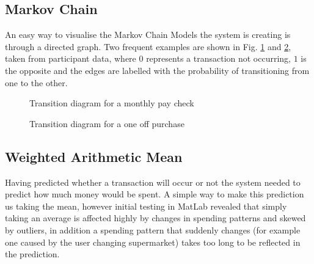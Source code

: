 \subsection{Markov Chain}

An easy way to visualise the Markov Chain Models the system is creating is through a directed graph. Two frequent examples are shown in Fig. \ref{fig:transition-monthly} and \ref{fig:transition-one}, taken from participant data, where $0$ represents a transaction not occurring, $1$ is the opposite and the edges are labelled with the probability of transitioning from one to the other. 

\begin{figure}[h]
\centering
{}
\caption{Transition diagram for a monthly pay check}
\label{fig:transition-monthly}
\end{figure}

\begin{figure}[h]
\centering
{}
\caption{Transition diagram for a one off purchase}
\label{fig:transition-one}
\end{figure}

\subsection{Weighted Arithmetic Mean}
Having predicted whether a transaction will occur or not the system needed to predict how much money would be spent. A simple way to make this prediction us taking the mean, however initial testing in MatLab revealed that simply taking an average is affected highly by changes in spending patterns and skewed by outliers, in addition a spending pattern that suddenly changes (for example one caused by the user changing supermarket) takes too long to be reflected in the prediction.

